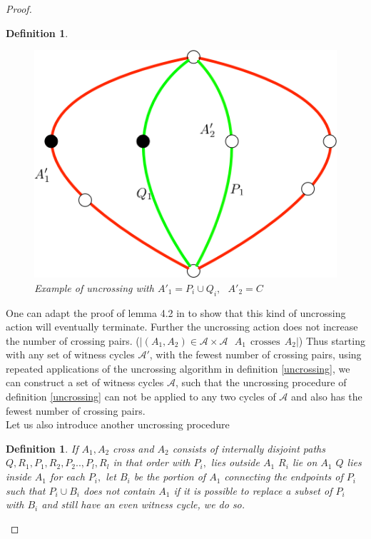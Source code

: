 \documentclass[letterpaper,11pt]{article}
\newtheorem{definition}[theorem]{Definition}
\newcommand{\0}{\mathbb{0}}
\newcommand{\1}{\mathbb{1}}
\begin{document}
\begin{proof}
\begin{definition}
\begin{figure}
\includegraphics[scale=0.25]{Uncrossed2.png} 
\caption{ Example of uncrossing  with   $ A'_1=P_i \cup Q_i ,   \ \ \ A'_2=C$  } 
\label{defcross2}
\end{figure}
\end{definition}   
One can adapt the proof of lemma 4.2 in \cite{GW98} to show  that this kind of uncrossing action will eventually terminate. 
Further the uncrossing action does not increase the number of crossing pairs. ($ | (A_1, A_2) \in \mathcal{A} \times  \mathcal{A}   \ \ \ A_1 \ \ \text{crosses} \ \ A_2   |  $)
Thus starting with any set of witness cycles $\mathcal{A}'$, with the fewest number of crossing pairs,  using repeated applications of the uncrossing algorithm in definition \ref{uncrossing}, we can construct a set of witness cycles $ \mathcal{A} $, such that the uncrossing procedure of definition \ref{uncrossing}  can not be applied to any two cycles of $\mathcal{A}$ and also has the fewest number of crossing pairs. \\
Let us also introduce another uncrossing procedure 
\begin{definition}\label{uncrossing2}
If  $A_1, A_2$ cross and  $A_2$ consists of internally disjoint paths $Q,   R_1, P_1, R_2, P_2 ..,  P_l, R_l$  in that order with  $P_i,$  lies outside $A_1$  $ R_i$ lie on $A_1$ $Q$ lies inside $A_1$ for each $P_i,$ let  $B_i$ be the portion of $A_1$ connecting the endpoints of $P_i$ such that $P_i \cup B_i$ does not contain $A_1$ if it is possible to replace a subset of $P_i$ with $B_i$ and still have an even witness cycle, we do so. 

\end{definition}
\end{proof}
\end{document}
